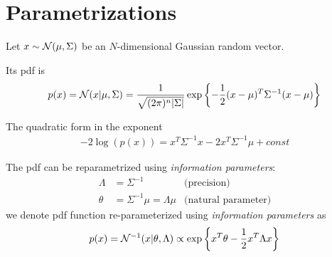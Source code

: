 \section{Parametrizations}
Let $x \sim \mathcal{N}(\mu, \Sigma)$ be an $N$-dimensional Gaussian random vector.

Its pdf is 
\begin{align}
	p(x) = \mathcal{N}(x| \mu, \Sigma) = \frac{1}{\sqrt{(2 \pi)^n |\Sigma|}} \exp\left\{-\frac12 (x-\mu)^T \Sigma^{-1} (x-\mu)\right\}
\end{align}

The quadratic form in the exponent 
\begin{align}
	-2\log(p(x)) = x^T \Sigma^{-1} x - 2 x^T \Sigma^{-1} \mu + const
\end{align}

The pdf can be reparametrized using \textit{information parameters}:
\begin{align}
	\Lambda &= \Sigma^{-1}  &\text{(precision)}\\
	\theta &= \Sigma^{-1} \mu = \Lambda \mu &\text{(natural parameter)}
\end{align}
we denote pdf function re-parameterized using \textit{information parameters} as
\begin{align}
	p(x) = \mathcal{N}^{-1}(x| \theta, \Lambda) \propto \exp\left\{x^T \theta - \frac12 x^T \Lambda x  \right\}
\end{align}

